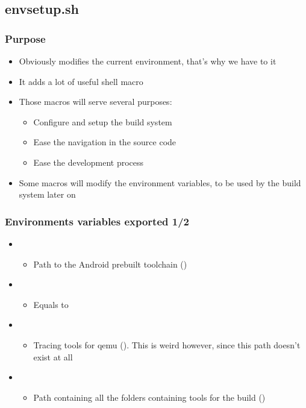 \subsection{envsetup.sh}

\begin{frame}
  \frametitle{Purpose}
  \begin{itemize}
  \item Obviously modifies the current environment, that's why we have
    to  it
  \item It adds a lot of useful shell macro
  \item Those macros will serve several purposes:
    \begin{itemize}
    \item Configure and setup the build system
    \item Ease the navigation in the source code
    \item Ease the development process
    \end{itemize}
  \item Some macros will modify the environment variables, to be used
    by the build system later on
  \end{itemize}
\end{frame}

\begin{frame}
  \frametitle{Environments variables exported 1/2}
  \begin{itemize}
  \item {}
    \begin{itemize}
    \item Path to the Android prebuilt toolchain
      ()
    \end{itemize}
  \item {}
    \begin{itemize}
    \item Equals to 
    \end{itemize}
  \item {}
    \begin{itemize}
    \item Tracing tools for qemu
      (). This is weird however,
      since this path doesn't exist at all
    \end{itemize}
  \item {}
    \begin{itemize}
    \item Path containing all the folders containing tools for the
      build
      ()
    \end{itemize}
  \end{itemize}
\end{frame}

